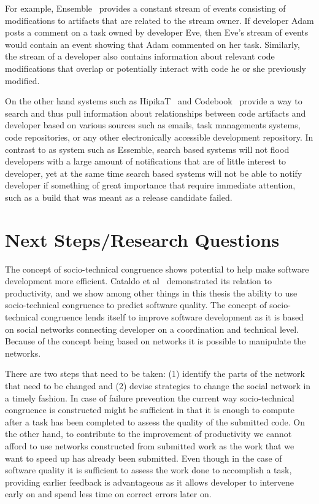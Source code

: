 For example, Ensemble~\cite{xiang:rsse:2008} provides a constant stream of events consisting of modifications to artifacts that are related to the stream owner.
If developer Adam posts a comment on a task owned by developer Eve, then Eve's stream of events would contain an event showing that Adam commented on her task.
Similarly, the stream of a developer also contains information about relevant code modifications that overlap or potentially interact with code he or she previously modified.

On the other hand systems such as HipikaT~\cite{cubranic:tse:2005} and Codebook~\cite{begel:icse:2010} provide a way to search and thus pull information about relationships between code artifacts and developer based on various sources such as emails, task managements systems, code repositories, or any other electronically accessible development repository.
In contrast to as system such as Essemble, search based systems will not flood developers with a large amount of notifications that are of little interest to developer, yet at the same time search based systems will not be able to notify developer if something of great importance that require immediate attention, such as a build that was meant as a release candidate failed.








\section{Next Steps/Research Questions}
The concept of socio-technical congruence shows potential to help make software development more efficient.
Cataldo et al~\cite{cataldo:cscw:2006} demonstrated its relation to productivity, and we show among other things in this thesis the ability to use socio-technical congruence to predict software quality.
The concept of socio-technical congruence lends itself to improve software development as it is based on social networks connecting developer on a coordination and technical level.
Because of the concept being based on networks it is possible to manipulate the networks.

There are two steps that need to be taken:
(1) identify the parts of the network that need to be changed
and (2) devise strategies to change the social network in a timely fashion.
In case of failure prevention the current way socio-technical congruence is constructed might be sufficient in that it is enough to compute after a task has been completed to assess the quality of the submitted code.
On the other hand, to contribute to the improvement of productivity we cannot afford to use networks constructed from submitted work as the work that we want to speed up has already been submitted.
Even though in the case of software quality it is sufficient to assess the work done to accomplish a task, providing earlier feedback is advantageous as it allows developer to intervene early on and spend less time on correct errors later on.

